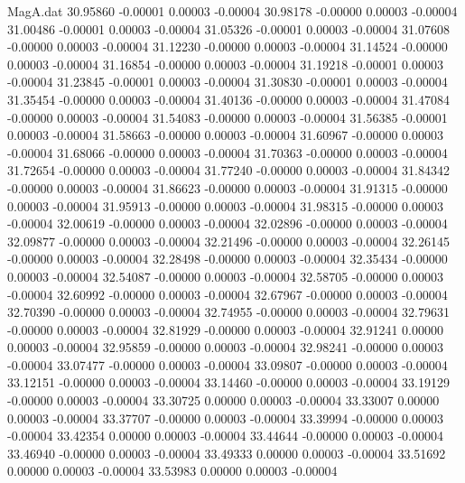 \begin{filecontents}{MagA.dat}
  30.95860   -0.00001    0.00003   -0.00004
  30.98178   -0.00000    0.00003   -0.00004
  31.00486   -0.00001    0.00003   -0.00004
  31.05326   -0.00001    0.00003   -0.00004
  31.07608   -0.00000    0.00003   -0.00004
  31.12230   -0.00000    0.00003   -0.00004
  31.14524   -0.00000    0.00003   -0.00004
  31.16854   -0.00000    0.00003   -0.00004
  31.19218   -0.00001    0.00003   -0.00004
  31.23845   -0.00001    0.00003   -0.00004
  31.30830   -0.00001    0.00003   -0.00004
  31.35454   -0.00000    0.00003   -0.00004
  31.40136   -0.00000    0.00003   -0.00004
  31.47084   -0.00000    0.00003   -0.00004
  31.54083   -0.00000    0.00003   -0.00004
  31.56385   -0.00001    0.00003   -0.00004
  31.58663   -0.00000    0.00003   -0.00004
  31.60967   -0.00000    0.00003   -0.00004
  31.68066   -0.00000    0.00003   -0.00004
  31.70363   -0.00000    0.00003   -0.00004
  31.72654   -0.00000    0.00003   -0.00004
  31.77240   -0.00000    0.00003   -0.00004
  31.84342   -0.00000    0.00003   -0.00004
  31.86623   -0.00000    0.00003   -0.00004
  31.91315   -0.00000    0.00003   -0.00004
  31.95913   -0.00000    0.00003   -0.00004
  31.98315   -0.00000    0.00003   -0.00004
  32.00619   -0.00000    0.00003   -0.00004
  32.02896   -0.00000    0.00003   -0.00004
  32.09877   -0.00000    0.00003   -0.00004
  32.21496   -0.00000    0.00003   -0.00004
  32.26145   -0.00000    0.00003   -0.00004
  32.28498   -0.00000    0.00003   -0.00004
  32.35434   -0.00000    0.00003   -0.00004
  32.54087   -0.00000    0.00003   -0.00004
  32.58705   -0.00000    0.00003   -0.00004
  32.60992   -0.00000    0.00003   -0.00004
  32.67967   -0.00000    0.00003   -0.00004
  32.70390   -0.00000    0.00003   -0.00004
  32.74955   -0.00000    0.00003   -0.00004
  32.79631   -0.00000    0.00003   -0.00004
  32.81929   -0.00000    0.00003   -0.00004
  32.91241    0.00000    0.00003   -0.00004
  32.95859   -0.00000    0.00003   -0.00004
  32.98241   -0.00000    0.00003   -0.00004
  33.07477   -0.00000    0.00003   -0.00004
  33.09807   -0.00000    0.00003   -0.00004
  33.12151   -0.00000    0.00003   -0.00004
  33.14460   -0.00000    0.00003   -0.00004
  33.19129   -0.00000    0.00003   -0.00004
  33.30725    0.00000    0.00003   -0.00004
  33.33007    0.00000    0.00003   -0.00004
  33.37707   -0.00000    0.00003   -0.00004
  33.39994   -0.00000    0.00003   -0.00004
  33.42354    0.00000    0.00003   -0.00004
  33.44644   -0.00000    0.00003   -0.00004
  33.46940   -0.00000    0.00003   -0.00004
  33.49333    0.00000    0.00003   -0.00004
  33.51692    0.00000    0.00003   -0.00004
  33.53983    0.00000    0.00003   -0.00004

\end{filecontents}
